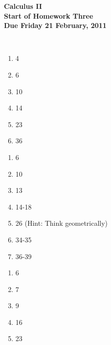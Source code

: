 \documentclass[12pt]{article}
\begin{document}
\pagestyle{empty}
 
\begin{center}
{\large {\bf Calculus II}}\\
\medskip
{\large {\bf Start of Homework Three}}\\
\medskip
{ {\bf Due Friday 21 February, 2011}}\\
\end{center}

\hspace{2mm}\\




\begin{enumerate}
\setlength{\itemsep}{-1mm}
  \item 4
  \item 6
  \item 10
  \item 14
  \item 23
  \item 36

\end{enumerate}




\begin{enumerate}
\setlength{\itemsep}{-1mm}
  \item 6
  \item 10
  \item 13
  \item 14-18
  \item 26 (Hint: Think geometrically)
  \item 34-35
  \item 36-39

\end{enumerate}



\begin{enumerate}
\setlength{\itemsep}{-1mm}
  \item 6
  \item 7
  \item 9
  \item 16
  \item 23

\end{enumerate}





\end{document}

